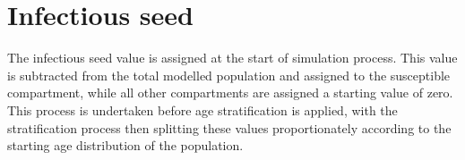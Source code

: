 \section{Infectious seed}
The infectious seed value is assigned at the start of simulation process.
This value is subtracted from the total modelled population and assigned to the susceptible compartment, while all other compartments are assigned a starting value of zero.
This process is undertaken before age stratification is applied,
with the stratification process then splitting these values proportionately according to the starting age distribution of the population.
